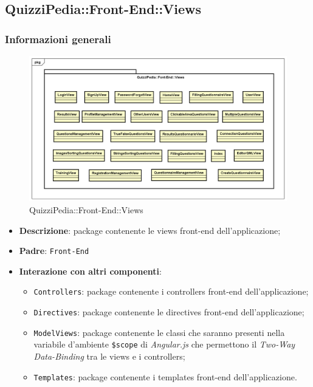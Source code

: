 \newpage

\subsection{QuizziPedia::Front-End::Views}
\subsubsection{Informazioni generali}
\label{QuizziPedia::Front-End::Views}
\begin{figure}
	\centering
	\includegraphics[scale=0.45]{UML/Package/QuizziPedia_Front-End_Views.png}
	\caption{QuizziPedia::Front-End::Views}
\end{figure}
\begin{itemize}
	\item \textbf{Descrizione}: package contenente le views front-end dell'applicazione;
	\item \textbf{Padre}: \texttt{Front-End}
	\item \textbf{Interazione con altri componenti}:
	\begin{itemize}
		\item \texttt{Controllers}: package contenente i controllers front-end dell'applicazione;
		\item \texttt{Directives}: package contenente le directives front-end dell'applicazione;
		\item \texttt{ModelViews}: package contenente le classi che saranno presenti nella variabile d'ambiente \texttt{\$scope} di \textit{Angular.js} che permettono il \textit{Two-Way Data-Binding} tra le views e i controllers;
		\item \texttt{Templates}: package contenente i templates front-end dell'applicazione.
	\end{itemize}
\end{itemize}
